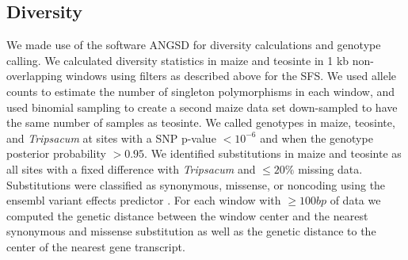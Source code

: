 \documentclass{pnastwo}
\begin{document}
\begin{article}
\begin{materials}

\subsection{Diversity}
We made use of the software ANGSD \cite{korneliussen2014} for diversity calculations and genotype calling. 
We calculated diversity statistics in maize and teosinte in 1 kb non-overlapping windows using filters as described above for the SFS. 
We used allele counts to estimate the number of singleton polymorphisms in each window, and used binomial sampling to create a second maize data set down-sampled to have the same number of samples as teosinte.
We called genotypes in maize, teosinte, and \emph{Tripsacum} at sites with a SNP p-value $<10^{-6}$ and when the genotype posterior probability $>0.95$.
We identified substitutions in maize and teosinte as all sites with a fixed difference with \emph{Tripsacum} and $\leq 20\%$ missing data. 
Substitutions were classified as synonymous, missense, or noncoding using the ensembl variant effects predictor \cite{mclaren2010}.
For each window with $\geq 100bp$ of data we computed the genetic distance between the window center and the nearest synonymous and missense substitution as well as the genetic distance to the center of the nearest gene transcript.  


\end{materials}
\end{article}
\end{document}
